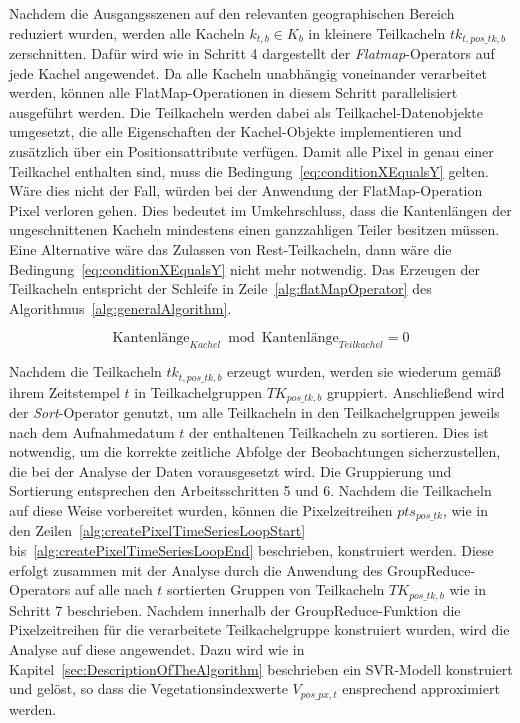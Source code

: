 Nachdem die Ausgangsszenen auf den relevanten geographischen Bereich reduziert wurden, werden alle Kacheln $k_{t, b} \in K_{b}$ in kleinere Teilkacheln $tk_{t, pos\_tk, b}$ zerschnitten. Dafür wird wie in Schritt 4 dargestellt der \textit{Flatmap}-Operators auf jede Kachel angewendet. Da alle Kacheln unabhängig voneinander verarbeitet werden, können alle FlatMap-Operationen in diesem Schritt parallelisiert ausgeführt werden. Die Teilkacheln werden dabei als Teilkachel-Datenobjekte umgesetzt, die alle Eigenschaften der Kachel-Objekte implementieren und zusätzlich über ein Positionsattribute verfügen. Damit alle Pixel in genau einer Teilkachel enthalten sind, muss die Bedingung~\ref{eq:conditionXEqualsY} gelten. Wäre dies nicht der Fall, würden bei der Anwendung der FlatMap-Operation Pixel verloren gehen. Dies bedeutet im Umkehrschluss, dass die Kantenlängen der ungeschnittenen Kacheln mindestens einen ganzzahligen Teiler besitzen müssen. Eine Alternative wäre das Zulassen von Rest-Teilkacheln, dann wäre die Bedingung~\ref{eq:conditionXEqualsY} nicht mehr notwendig. Das Erzeugen der Teilkacheln entspricht der Schleife in Zeile~\ref{alg:flatMapOperator} des Algorithmus~\ref{alg:generalAlgorithm}.

\begin{equation} \label{eq:conditionXEqualsY}
\text{Kantenlänge}_{Kachel} \bmod \text{Kantenlänge}_{Teilkachel} = 0
\end{equation}
 
Nachdem die Teilkacheln $tk_{t, pos\_tk, b}$ erzeugt wurden, werden sie wiederum gemäß ihrem Zeitstempel $t$ in Teilkachelgruppen $TK_{pos\_tk, b}$ gruppiert. Anschließend wird der \textit{Sort}-Operator genutzt, um alle Teilkacheln in den Teilkachelgruppen jeweils nach dem Aufnahmedatum $t$ der enthaltenen Teilkacheln zu sortieren. Dies ist notwendig, um die korrekte zeitliche Abfolge der Beobachtungen sicherzustellen, die bei der Analyse der Daten vorausgesetzt wird. Die Gruppierung und Sortierung entsprechen den Arbeitsschritten 5 und 6.
Nachdem die Teilkacheln auf diese Weise vorbereitet wurden, können die Pixelzeitreihen $pts_{pos\_tk}$, wie in den Zeilen~\ref{alg:createPixelTimeSeriesLoopStart} bis~\ref{alg:createPixelTimeSeriesLoopEnd} beschrieben, konstruiert werden. 
Diese erfolgt zusammen mit der Analyse durch die Anwendung des GroupReduce-Operators auf alle nach $t$ sortierten Gruppen von Teilkacheln $TK_{pos\_tk, b}$ wie in Schritt 7 beschrieben. Nachdem innerhalb der GroupReduce-Funktion die Pixelzeitreihen für die verarbeitete Teilkachelgruppe konstruiert wurden, wird die Analyse auf diese angewendet. Dazu wird wie in Kapitel~\ref{sec:DescriptionOfTheAlgorithm} beschrieben ein SVR-Modell konstruiert und gelöst, so dass die Vegetationsindexwerte $V_{pos\_px, t}$ ensprechend approximiert werden. 

